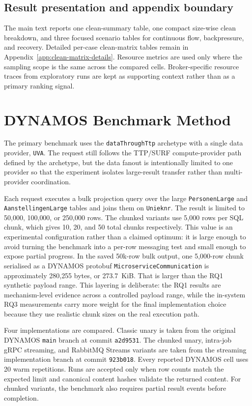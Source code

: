 \subsection{Result presentation and appendix boundary}

The main text reports one clean-summary table, one compact size-wise clean breakdown, and three focused scenario tables for continuous flow, backpressure, and recovery. Detailed per-case clean-matrix tables remain in Appendix~\ref{app:clean-matrix-details}. Resource metrics are used only where the sampling scope is the same across the compared cells. Broker-specific resource traces from exploratory runs are kept as supporting context rather than as a primary ranking signal. 

\section{DYNAMOS Benchmark Method}\label{sec:dynamos-method}

The primary benchmark uses the \texttt{dataThroughTtp} archetype with a single data provider, \texttt{UVA}. The request still follows the TTP/SURF compute-provider path defined by the archetype, but the data fanout is intentionally limited to one provider so that the experiment isolates large-result transfer rather than multi-provider coordination.

Each request executes a bulk projection query over the large \texttt{PersonenLarge} and \texttt{AanstellingenLarge} tables and joins them on \texttt{Unieknr}. The result is limited to 50{,}000, 100{,}000, or 250{,}000 rows. The chunked variants use 5{,}000 rows per SQL chunk, which gives 10, 20, and 50 total chunks respectively. This value is an experimental configuration rather than a claimed optimum: it is large enough to avoid turning the benchmark into a per-row messaging test and small enough to expose partial progress. In the saved 50k-row bulk output, one 5{,}000-row chunk serialised as a DYNAMOS protobuf \texttt{MicroserviceCommunication} is approximately 280{,}255 bytes, or 273.7~KiB. That is larger than the RQ1 synthetic payload range. This layering is deliberate: the RQ1 results are mechanism-level evidence across a controlled payload range, while the in-system RQ3 measurements carry more weight for the final implementation choice because they use realistic chunk sizes on the real execution path.

Four implementations are compared. Classic unary is taken from the original DYNAMOS \texttt{main} branch at commit \texttt{a2d9531}. The chunked unary, intra-job gRPC streaming, and RabbitMQ Streams variants are taken from the streaming implementation branch at commit \texttt{923b018}. Every reported DYNAMOS cell uses 20 warm repetitions. Runs are accepted only when row counts match the expected limit and canonical content hashes validate the returned content. For chunked variants, the benchmark also requires partial result events before completion.

